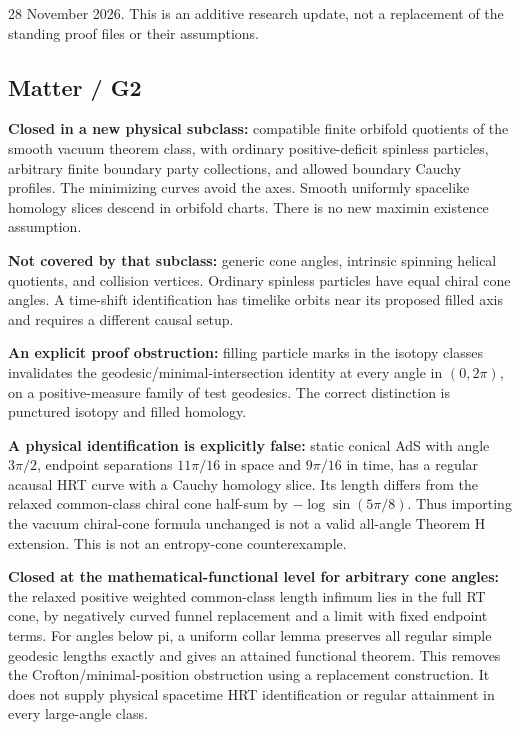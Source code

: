 \documentclass[11pt]{article}
\begin{document}
28 November 2026. This is an additive research update, not a replacement
of the standing proof files or their assumptions.

\subsection{Matter / G2}\label{matter-g2}

\textbf{Closed in a new physical subclass:} compatible finite orbifold
quotients of the smooth vacuum theorem class, with ordinary
positive-deficit spinless particles, arbitrary finite boundary party
collections, and allowed boundary Cauchy profiles. The minimizing curves
avoid the axes. Smooth uniformly spacelike homology slices descend in
orbifold charts. There is no new maximin existence assumption.

\textbf{Not covered by that subclass:} generic cone angles, intrinsic
spinning helical quotients, and collision vertices. Ordinary spinless
particles have equal chiral cone angles. A time-shift identification has
timelike orbits near its proposed filled axis and requires a different
causal setup.

\textbf{An explicit proof obstruction:} filling particle marks in the
isotopy classes invalidates the geodesic/minimal-intersection identity
at every angle in \((0,2\pi)\), on a positive-measure family of test
geodesics. The correct distinction is punctured isotopy and filled
homology.

\textbf{A physical identification is explicitly false:} static conical
AdS with angle \(3\pi/2\), endpoint separations \(11\pi/16\) in space
and \(9\pi/16\) in time, has a regular acausal HRT curve with a Cauchy
homology slice. Its length differs from the relaxed common-class chiral
cone half-sum by \(-\log\sin(5\pi/8)\). Thus importing the vacuum
chiral-cone formula unchanged is not a valid all-angle Theorem H
extension. This is not an entropy-cone counterexample.

\textbf{Closed at the mathematical-functional level for arbitrary cone
angles:} the relaxed positive weighted common-class length infimum lies
in the full RT cone, by negatively curved funnel replacement and a limit
with fixed endpoint terms. For angles below pi, a uniform collar lemma
preserves all regular simple geodesic lengths exactly and gives an
attained functional theorem. This removes the Crofton/minimal-position
obstruction using a replacement construction. It does not supply
physical spacetime HRT identification or regular attainment in every
large-angle class.
\end{document}
